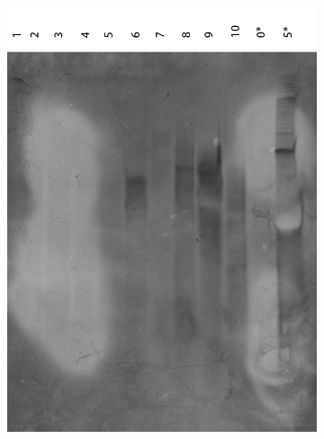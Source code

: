 \begin{figure}[h]
  \begin{subfigure}[t]{0.49\textwidth}
  \includegraphics[width=\textwidth]{images/translator_transcription_1.png}
  \caption{}
  \label{transcription_1}
  \end{subfigure}
  \begin{subfigure}[t]{0.49\textwidth}

\end{subfigure}
\end{figure}
